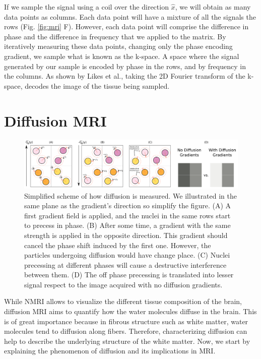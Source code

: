 If we sample the signal using a coil over the direction $\hat x$, we will obtain
as many data points as columns. Each data point will have a mixture of all
the signals the rows (Fig. \ref{fig:mri} F).
However, each data point will comprise the difference in phase and the
difference in frequency that we applied to the matrix. By iteratively
measuring these data points, changing only the phase encoding gradient, we
sample what is known as the k-space\cite{Likes1981}. A space where the signal
generated by our sample is encoded by phase in the rows, and by frequency in the
columns. As shown by Likes et al.\cite{Likes1981}, taking the 2D Fourier
transform of the k-space, decodes the image of the tissue being sampled.

\section{Diffusion MRI}

\begin{figure}[t]
    \includegraphics[width=\textwidth]{3.mri/img/diffusion.png}
    \caption{Simplified scheme of how diffusion is measured. We illustrated
             in the same plane as the gradient's direction so simplify the figure.
             (A) A first gradient field is applied, and the nuclei in the same
             rows start to precess in phase. (B) After some time, a gradient
             with the same strength is applied in the opposite direction. This
             gradient should cancel the phase shift induced by the first one.
             However, the particles undergoing diffusion would have change
             place. (C) Nuclei precessing at different phases will cause a
             destructive interference between them. (D) The off phase precessing
             is translated into lesser signal respect to the image acquired with
             no diffusion gradients.}
     \label{fig:diffusion_gradient}
\end{figure}

While NMRI allows to visualize the different tissue composition of the brain,
diffusion MRI aims to quantify how the water molecules diffuse in the brain.
This is of great importance because in fibrous structure such as white matter,
water molecules tend to diffusion along fibers. Therefore, characterizing diffusion
can help to describe the underlying structure of the white matter. Now, we
start by explaining the phenomenon of diffusion and its implications in MRI.

